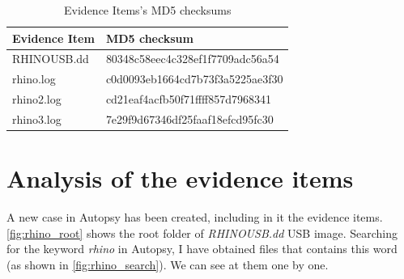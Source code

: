 \documentclass{article}
\begin{document}
\begin{table}[h!]
	\centering
	\begin{tabular}{l|l}
		Evidence Item & MD5 checksum\\
		\hline
		RHINOUSB.dd & 80348c58eec4c328ef1f7709adc56a54\\
		rhino.log & c0d0093eb1664cd7b73f3a5225ae3f30\\
		rhino2.log & cd21eaf4acfb50f71ffff857d7968341\\
		rhino3.log & 7e29f9d67346df25faaf18efcd95fc30
	\end{tabular}
	\caption{Evidence Items's MD5 checksums}
	\label{tab:checksum}
\end{table}

\section{Analysis of the evidence items}
A new case in Autopsy has been created, including in it the evidence items. \autoref{fig:rhino_root} shows the root folder of \textit{RHINOUSB.dd} USB image.
Searching for the keyword \textit{rhino} in Autopsy, I have obtained files that contains this word (as shown in \autoref{fig:rhino_search}). We can see at them one by one.
\end{document}
